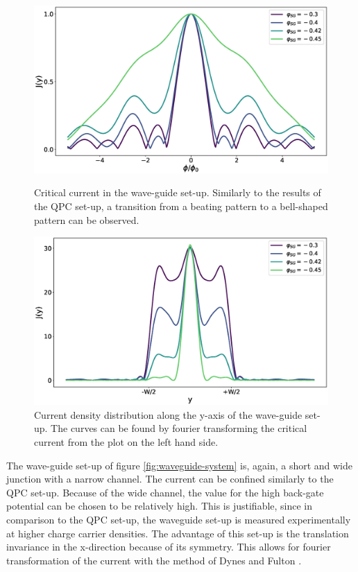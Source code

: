 \begin{figure}[ht]
\begin{minipage}[b]{0.5\linewidth}
\centering
\includegraphics[width=\textwidth]{figure/numericalmodel/waveguide-ic}
\caption{Critical current in the wave-guide set-up. Similarly to the results of the QPC set-up, a transition from a beating pattern to a bell-shaped pattern can be observed.} \label{fig:waveguide-ic}
\end{minipage}
\begin{minipage}[b]{0.5\linewidth}
\centering
\includegraphics[width=\textwidth]{figure/numericalmodel/waveguide-jy}
\caption{Current density distribution along the y-axis of the wave-guide set-up. The curves can be found by fourier transforming the critical current from the plot on the left hand side.}\label{fig:waveguide-jy}
\end{minipage}
\end{figure}
The wave-guide set-up of figure \ref{fig:waveguide-system} is, again, a short and wide junction with a narrow channel. The current can be confined similarly to the QPC set-up. Because of the wide channel, the value for the high back-gate potential can be chosen to be relatively high. This is justifiable, since in comparison to the QPC set-up, the waveguide set-up is measured experimentally at higher charge carrier densities. The advantage of this set-up is the translation invariance in the x-direction because of its symmetry. This allows for fourier transformation of the current with the method of Dynes and Fulton \cite{Dynes1971}.

